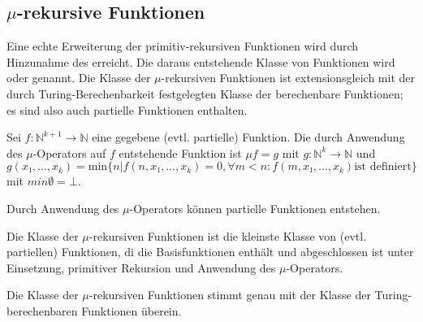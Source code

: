 \documentclass{scrartcl}
\begin{document}
\begin{enumerate*}
\begin{remark}
\begin{remark}

\subsection{$μ$-rekursive Funktionen}

Eine echte Erweiterung der primitiv-rekursiven Funktionen wird durch
Hinzunahme des  erreicht. 
Die daraus entstehende Klasse von Funktionen wird 
 oder 
genannt. 
Die Klasse der $μ$-rekursiven Funktionen ist extensionsgleich mit der durch 
Turing-Berechenbarkeit festgelegten Klasse der berechenbare Funktionen;
es sind also auch partielle Funktionen enthalten.

\begin{definition}
Sei $f: ℕ^{k + 1} → ℕ$ eine gegebene (evtl. partielle) Funktion.
Die durch Anwendung des $μ$-Operators auf $f$ entstehende Funktion ist 
$μf = g$ mit $g: ℕ^k → ℕ$ und
$ g(x₁,\dots,x_k) = 
	\text{min} \{ n | f(n,x₁,\dots,x_k) = 0, ∀ m<n: f(m,x₁,\dots,x_k) \text{ist definiert}\}$
mit $min ∅ = ⊥$.
\end{definition}

\begin{remark}
Durch Anwendung des $μ$-Operators können partielle Funktionen entstehen.
\end{remark}

\begin{definition}
Die Klasse der $μ$-rekursiven Funktionen ist die kleinste Klasse von
(evtl. partiellen) Funktionen, di die Basisfunktionen enthält und 
abgeschlossen ist unter Einsetzung, primitiver Rekursion und 
Anwendung des $μ$-Operators.
\end{definition}

\begin{theorem}
Die Klasse der $μ$-rekursiven Funktionen stimmt genau mit der Klasse 
der Turing-berechenbaren Funktionen überein.
\end{theorem}


\end{remark}
\end{remark}
\end{enumerate*}
\end{document}
